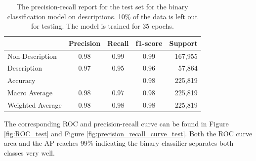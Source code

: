 \documentclass[a4paper, 12pt, oneside]{book} %
\begin{document}
\begin{table}[h]
\centering
\caption[Precision-recall report for test data]{The precision-recall report for the test set for the binary classification model on descriptions. 10\% of the data is left out for testing. The model is trained for 35 epochs.}
\label{tab:precision_recall_descriptionsmodel}
\begin{tabular}{@{}lcccr@{}}
\cmidrule(l){2-5}
 & \multicolumn{1}{l}{Precision} & \multicolumn{1}{l}{Recall} & \multicolumn{1}{l}{f1-score} & \multicolumn{1}{l}{Support} \\ \midrule
Non-Description  & 0.98 & 0.99 & 0.99 & 167,955 \\
Description      & 0.97 & 0.95 & 0.96 & 57,864  \\ \midrule
Accuracy         &      &      & 0.98 & 225,819 \\
Macro Average    & 0.98 & 0.97 & 0.98 & 225,819 \\
Weighted Average & 0.98 & 0.98 & 0.98 & 225,819 \\ \bottomrule
\end{tabular}
\end{table}

\noindent
The corresponding ROC and precision-recall curve can be found in Figure \ref{fig:ROC_test} and Figure \ref{fig:precision_recall_curve_test}.
Both the ROC curve area and the AP reaches 99\% indicating the binary classifier separates both classes very well.
\end{document}
